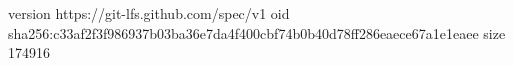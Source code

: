 version https://git-lfs.github.com/spec/v1
oid sha256:c33af2f3f986937b03ba36e7da4f400cbf74b0b40d78ff286eaece67a1e1eaee
size 174916

